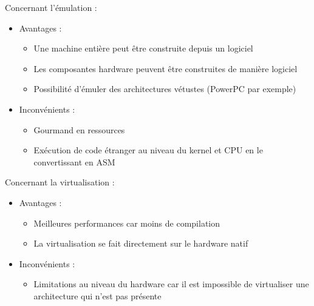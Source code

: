 Concernant l'émulation :
\begin{itemize}
	\item Avantages :
	\begin{itemize}
		\item Une machine entière peut être construite depuis un logiciel
		\item Les composantes hardware peuvent être construites de manière logiciel
		\item Possibilité d'émuler des architectures vétustes (PowerPC par exemple)
	\end{itemize}
	\item Inconvénients :
	\begin{itemize}
		\item Gourmand en ressources
		\item Exécution de code étranger au niveau du kernel et CPU en le convertissant en ASM
	\end{itemize}
\end{itemize}
Concernant la virtualisation :
\begin{itemize}
	\item Avantages :
	\begin{itemize}
		\item Meilleures performances car moins de compilation
		\item La virtualisation se fait directement sur le hardware natif
	\end{itemize}
	\item Inconvénients :
	\begin{itemize}
		\item Limitations au niveau du hardware car il est impossible de virtualiser une architecture qui n'est pas présente
	\end{itemize}
\end{itemize}
\cite{evs}
\cite{evs2}
\newline


